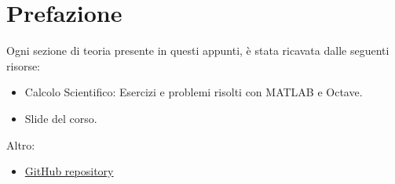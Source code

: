 \section*{Prefazione}

Ogni sezione di teoria presente in questi appunti, è stata ricavata dalle seguenti risorse:
\begin{itemize}
    \item Calcolo Scientifico: Esercizi e problemi risolti con MATLAB e Octave.\cite{quarteroni2017calcolo}
    \item Slide del corso.\cite{slides}
\end{itemize}
Altro:
\begin{itemize}
    \item[\faIcon{github}] \href{https://github.com/PoliMI-HPC-E-notes-projects-AndreVale69/HPC-E-PoliMI-university-notes}{GitHub repository}
\end{itemize}